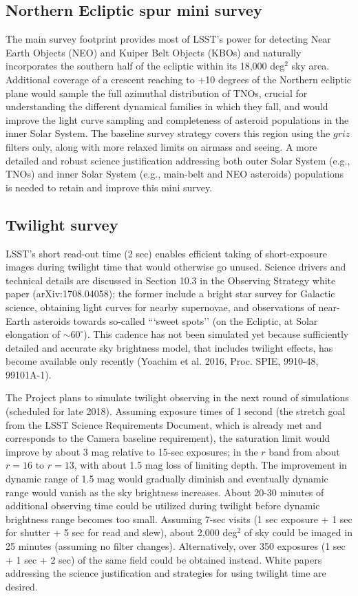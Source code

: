 \documentclass[DM,lsstdraft,toc,usenatbib]{lsstdoc}
\begin{document}
\subsection{Northern Ecliptic spur mini survey}

The main survey footprint provides most of LSST's power for detecting Near Earth Objects (NEO) and 
Kuiper Belt Objects (KBOs) and naturally incorporates the southern half of the ecliptic within its 
18,000 deg$^2$ sky area. Additional coverage of a crescent reaching to +10 degrees of the Northern ecliptic 
plane would sample the full azimuthal distribution of TNOs, crucial for understanding the different 
dynamical families in which they fall, and would improve the light curve sampling and completeness
of asteroid populations in the inner Solar System. The baseline survey strategy covers this region using the 
$griz$ filters only, along with more relaxed limits on airmass and seeing. A more detailed 
and robust science justification addressing both outer Solar System (e.g., TNOs) and inner Solar
System (e.g., main-belt and NEO asteroids) populations is needed to retain and improve this mini survey. 


\subsection{Twilight survey \label{sec:twilight}} 

LSST's short read-out time (2 sec) enables efficient taking of short-exposure images during twilight time 
that would otherwise go unused. Science drivers and technical details are discussed in Section 10.3 in the 
Observing Strategy white paper (arXiv:1708.04058); the former include a bright star survey for Galactic
science, obtaining light curves for nearby supernovae, and observations of near-Earth asteroids towards
so-called ```sweet spots'' (on the Ecliptic, at Solar elongation of $\sim60^\circ$). This cadence has not 
been simulated yet because sufficiently detailed and accurate sky brightness model, that includes twilight 
effects, has become available only recently (Yoachim et al. 2016, Proc. SPIE, 9910-48, 99101A-1). 

The Project plans to simulate twilight observing in the next round of simulations (scheduled for late 2018). 
Assuming exposure times of 1 second (the stretch goal from the LSST Science Requirements Document, 
which is already met and corresponds to the Camera baseline requirement), the saturation limit would 
improve by about 3 mag relative to 15-sec exposures; in the $r$ band from about $r=16$ to $r=13$,
with about 1.5 mag loss of limiting depth. The improvement in dynamic range of 1.5 mag would gradually
diminish and eventually dynamic range would vanish as the sky brightness increases. About 20-30 minutes
of additional observing time could be utilized during twilight before dynamic brightness range becomes
too small. Assuming 7-sec visits (1 sec exposure + 1 sec for shutter + 5 sec for read and slew), about 
2,000 deg$^2$ of sky could be imaged in 25 minutes (assuming no filter changes). Alternatively, over 
350 exposures (1 sec + 1 sec + 2 sec) of the same field could be obtained instead.  White papers addressing
the science justification and strategies for using twilight time are desired.
\end{document}
